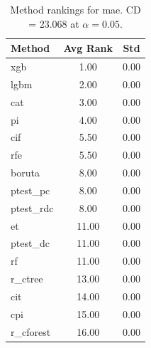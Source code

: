 \begin{table}[h]
\centering
\caption{Method rankings for mae. CD = 23.068 at $\alpha=0.05$.}
\label{tab:ranks_mae}
\begin{tabular}{lcc}
\toprule
Method & Avg Rank & Std \\
\midrule
xgb & 1.00 & 0.00 \\
lgbm & 2.00 & 0.00 \\
cat & 3.00 & 0.00 \\
pi & 4.00 & 0.00 \\
cif & 5.50 & 0.00 \\
rfe & 5.50 & 0.00 \\
boruta & 8.00 & 0.00 \\
ptest_pc & 8.00 & 0.00 \\
ptest_rdc & 8.00 & 0.00 \\
et & 11.00 & 0.00 \\
ptest_dc & 11.00 & 0.00 \\
rf & 11.00 & 0.00 \\
r_ctree & 13.00 & 0.00 \\
cit & 14.00 & 0.00 \\
cpi & 15.00 & 0.00 \\
r_cforest & 16.00 & 0.00 \\
\bottomrule
\end{tabular}
\end{table}